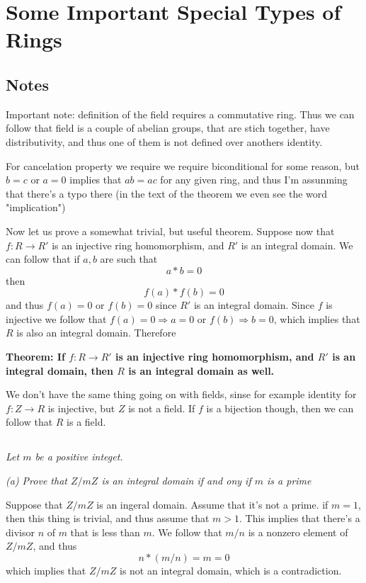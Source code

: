 \documentclass[11pt,oneside,titlepage]{book}
\DeclareMathOperator \ra {\Rightarrow}
\begin{document}
\section{Some Important Special Types of Rings}

\subsection*{Notes}

Important note: definition of the field requires a commutative
ring. Thus we can follow that field is a couple of abelian groups,
that are stich together, have distributivity, and thus one of them is
not defined over anothers identity.

For cancelation property we require we require biconditional for some
reason, but $b = c$ or $a = 0$ implies that $ab = ac$ for any given
ring, and thus I'm assunming that there's a typo there (in the text of
the theorem we even see the word "implication")

Now let us prove a somewhat trivial, but useful theorem.  Suppose now
that $f: R \to R'$ is an injective ring homomorphism, and $R'$ is an
integral domain. We can follow that if $a, b$ are such that
$$a * b = 0$$
then
$$f(a) * f(b) = 0$$
and thus $f(a) = 0$ or $f(b) = 0$ since $R'$ is an integral domain.
Since $f$ is injective we follow that $f(a) = 0 \ra a = 0$ or $f(b)
\ra b = 0$, which implies that $R$ is also an integral
domain. Therefore

\textbf{Theorem: If $f: R \to R'$ is an injective ring homomorphism,
and $R'$ is an integral domain, then $R$ is an integral domain as
well.}

We don't have the same thing going on with fields, sinse for example
identity for $f: Z \to R$ is injective, but $Z$ is not a field. If $f$
is a bijection though, then we can follow that $R$ is a field.


\subsection{}

\textit{Let $m$ be a positive integet.}

\textit{(a) Prove that $Z/mZ$ is an integral domain if and ony if $m$
is a prime}

Suppose that $Z/mZ$ is an ingeral domain. Assume that it's not a
prime.  if $m = 1$, then this thing is trivial, and thus assume that
$m > 1$.  This implies that there's a divisor $n$ of $m$ that is less
than $m$.  We follow that $m / n$ is a nonzero element of $Z/mZ$, and
thus
$$n * (m / n) = m = 0$$
which implies that $Z/mZ$ is not an integral domain, which is a
contradiction.
\end{document}
